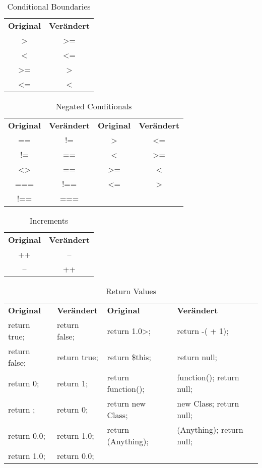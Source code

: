 \begin{table}[H]
	\caption{Conditional Boundaries}
	\begin{tabular}{cc}
		\textbf{Original} & \textbf{Verändert} \\
		> & >= \\
		< & <= \\
		>= & > \\
		<= & < \\
	\end{tabular}
\end{table}

\begin{table}[H]
	\caption{Negated Conditionals}
	\begin{tabular}{cccc}
		\textbf{Original} & \textbf{Verändert} & \textbf{Original} & \textbf{Verändert} \\
		== & != & > & <= \\
		!= & == & < & >= \\
        <> & == & >= & < \\
	    === & !== & <= & > \\
        !== & === &  &  \\
	\end{tabular}
\end{table}

\begin{table}[H]
	\caption{Increments}
	\begin{tabular}{cc}
		\textbf{Original} & \textbf{Verändert} \\
		++ & -- \\
		-- & ++ \\
	\end{tabular}
\end{table}

\begin{table}[H]
	\caption{Return Values}
	\begin{tabular}{llll}
		\textbf{Original} & \textbf{Verändert} & \textbf{Original} & \textbf{Verändert} \\
		return true; & return false; & return 1.0>; & return -( + 1); \\
		return false; & return true; & return \$this; & return null; \\
		return 0; & return 1; & return function(); & function(); return null; \\
		return ; & return 0; & return new Class; & new Class; return null; \\
		return 0.0; & return 1.0; & return (Anything); & (Anything); return null; \\
		return 1.0; & return 0.0; & & \\
	\end{tabular}
\end{table}

